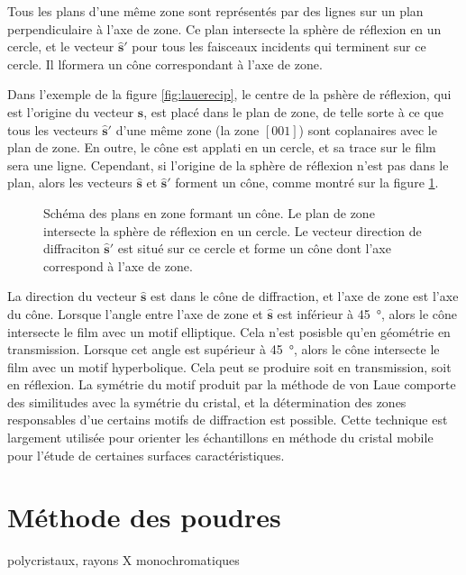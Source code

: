 Tous les plans d'une même zone sont représentés par des lignes sur un plan perpendiculaire à l'axe de zone. Ce plan intersecte la sphère de réflexion en un cercle, et le vecteur $\mathbf{\hat{s}'}$ pour tous les faisceaux incidents qui terminent sur ce cercle. Il lformera un cône correspondant à l'axe de zone.

Dans l'exemple de la figure \ref{fig:lauerecip}, le centre de la pshère de réflexion, qui est l'origine du vecteur $\mathbf{\hat{s}}$, est placé dans le plan de zone, de telle sorte à ce que tous les vecteurs $\mathbf{\hat{s}'}$ d'une même zone (la zone $[001]$) sont coplanaires avec le plan de zone. En outre, le cône est applati en un cercle, et sa trace sur le film sera une ligne. Cependant, si l'origine de la sphère de réflexion n'est pas dans le plan, alors les vecteurs $\mathbf{\hat{s}}$ et $\mathbf{\hat{s}'}$  forment un cône, comme montré sur la figure \ref{fig:lauecone}.

\begin{figure}
    \TODO
    \caption{Schéma des plans en zone formant un cône. Le plan de zone intersecte la sphère de réflexion en un cercle. Le vecteur direction de diffraciton $\mathbf{\hat{s}'}$ est situé sur ce cercle et forme un cône dont l'axe correspond à l'axe de zone.}
    \label{fig:lauecone}
\end{figure}

La direction du vecteur $\mathbf{\hat{s}}$ est dans le cône de diffraction, et l'axe de zone est l'axe du cône. Lorsque l'angle entre l'axe de zone et $\mathbf{\hat{s}}$ est inférieur à \SI{45}{\degree}, alors le cône intersecte le film avec un motif elliptique. Cela n'est posisble qu'en géométrie en transmission. Lorsque cet angle est supérieur à \SI{45}{\degree}, alors le cône intersecte le film avec un motif hyperbolique. Cela peut se produire soit en transmission, soit en réflexion. La symétrie du motif produit par la méthode de von Laue comporte des similitudes avec la symétrie du cristal, et la détermination des zones responsables d'ue certains motifs de diffraction est possible. Cette technique est largement utilisée pour orienter les échantillons en méthode du cristal mobile pour l'étude de certaines surfaces caractéristiques.


\section{Méthode des poudres}
polycristaux, rayons X monochromatiques


